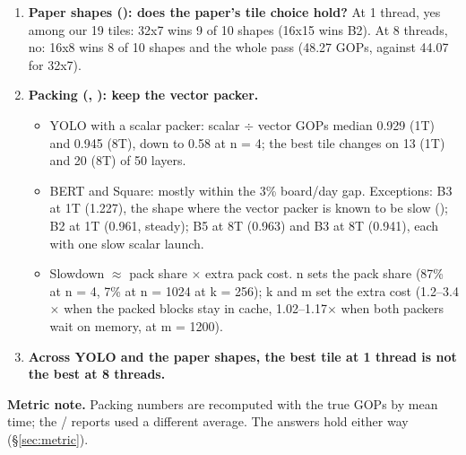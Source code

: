 \begin{enumerate}
\begin{itemize}
  \end{itemize}
\item \textbf{Paper shapes (): does the paper's tile choice hold?} At 1 thread, yes among our 19 tiles: 32x7 wins 9 of 10 shapes (16x15 wins B2). At 8 threads, no: 16x8 wins 8 of 10 shapes and the whole pass (48.27 GOPs, against 44.07 for 32x7).
\item \textbf{Packing (, ): keep the vector packer.}
  \begin{itemize}\setlength\itemsep{1pt}
  \item YOLO with a scalar packer: scalar $\div$ vector GOPs median 0.929 (1T) and 0.945 (8T), down to 0.58 at n = 4; the best tile changes on 13 (1T) and 20 (8T) of 50 layers.
  \item BERT and Square: mostly within the 3\% board/day gap. Exceptions: B3 at 1T (1.227), the shape where the vector packer is known to be slow (); B2 at 1T (0.961, steady); B5 at 8T (0.963) and B3 at 8T (0.941), each with one slow scalar launch.
  \item Slowdown $\approx$ pack share $\times$ extra pack cost. n sets the pack share (87\% at n = 4, 7\% at n = 1024 at k = 256); k and m set the extra cost (1.2--3.4$\times$ when the packed blocks stay in cache, 1.02--1.17$\times$ when both packers wait on memory, at m = 1200).
  \end{itemize}
\item \textbf{Across YOLO and the paper shapes, the best tile at 1 thread is not the best at 8 threads.}
\end{enumerate}

\noindent\textbf{Metric note.} Packing numbers are recomputed with the true GOPs by mean time; the  /  reports used a different average. The answers hold either way (\S\ref{sec:metric}).

